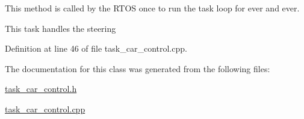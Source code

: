 This method is called by the R\+T\+OS once to run the task loop for ever and ever.

This task handles the steering 

Definition at line 46 of file task\+\_\+car\+\_\+control.\+cpp.



The documentation for this class was generated from the following files\+:\begin{DoxyCompactItemize}
\item 
\mbox{\hyperlink{task__car__control_8h}{task\+\_\+car\+\_\+control.\+h}}\item 
\mbox{\hyperlink{task__car__control_8cpp}{task\+\_\+car\+\_\+control.\+cpp}}\end{DoxyCompactItemize}
